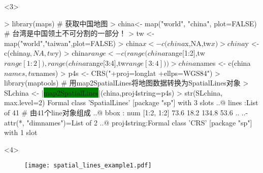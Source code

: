 \begin{frame}[t,fragile]{\subsecname}{\subsubsecname}
\begin{overlayarea}{\textwidth}{\textheight}
\begin{onlyenv}<3>
\begin{rcode}
> library(maps)
# 获取中国地图
> china<- map("world", "china", plot=FALSE)
# 台湾是中国领土不可分割的一部分！
> tw <- map("world","taiwan",plot=FALSE)
> china$x <- c(china$x,NA,tw$x)
> china$y <- c(china$y,NA,tw$y)
> china$range <- c(range(china$range[1:2],tw$range[1:2]),range(china$range[3:4],tw$range[3:4]))
> china$names <- c(china$names,tw$names)
> p4s <- CRS("+proj=longlat +ellps=WGS84")
> library(maptools)
# 用map2SpatialLines将地图数据转换为SpatialLines对象
> SLchina <- |\colorbox{green}{map2SpatialLines}|(china,proj4string=p4s)
> str(SLchina, max.level=2)
Formal class 'SpatialLines' [package "sp"] with 3 slots
  ..@ lines      :List of 41  # 由41个line对象组成
  ..@ bbox       : num [1:2, 1:2] 73.6 18.2 134.8 53.6
  .. ..- attr(*, "dimnames")=List of 2
  ..@ proj4string:Formal class 'CRS' [package "sp"] with 1 slot
\end{rcode}
\end{onlyenv}

\begin{onlyenv}<4>
\begin{figure}[ht] \vspace{-15pt}
  \texttt{[image: spatial\_lines\_example1.pdf]}
\end{figure}
\end{onlyenv}
\end{overlayarea}
\end{frame}

